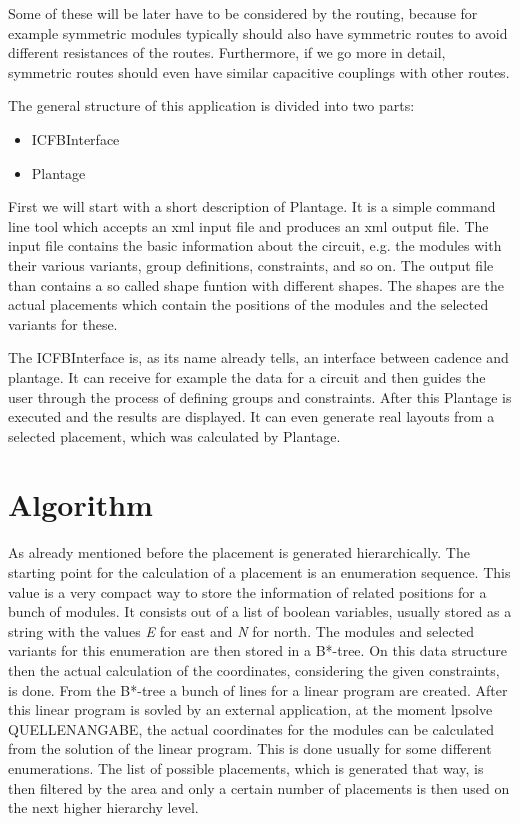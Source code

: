Some of these will be later have to be considered by the routing, because for example symmetric modules typically should also have symmetric routes to avoid different resistances of the routes. Furthermore, if we go more in detail, symmetric routes should even have similar capacitive couplings with other routes.

The general structure of this application is divided into two parts:
\begin{itemize}
\item ICFBInterface
\item Plantage
\end{itemize}

First we will start with a short description of Plantage. It is a simple command line tool which accepts an xml input file and produces an xml output file. The input file contains the basic information about the circuit, e.g. the modules with their various variants, group definitions, constraints, and so on. The output file than contains a so called shape funtion with different shapes. The shapes are the actual placements which contain the positions of the modules and the selected variants for these.

The ICFBInterface is, as its name already tells, an interface between cadence and plantage. It can receive for example the data for a circuit and then guides the user through the process of defining groups and constraints. After this Plantage is executed and the results are displayed. It can even generate real layouts from a selected placement, which was calculated by Plantage.

\section{Algorithm}
As already mentioned before the placement is generated hierarchically. The starting point for the calculation of a placement is an enumeration sequence. This value is a very compact way to store the information of related positions for a bunch of modules. It consists out of a list of boolean variables, usually stored as a string with the values \textit{E} for east and \textit{N} for north. The modules and selected variants for this enumeration are then stored in a B*-tree. On this data structure then the actual calculation of the coordinates, considering the given constraints, is done. From the B*-tree a bunch of lines for a linear program are created. After this linear program is sovled by an external application, at the moment lpsolve QUELLENANGABE, the actual coordinates for the modules can be calculated from the solution of the linear program. This is done usually for some different enumerations. The list of possible placements, which is generated that way, is then filtered by the area and only a certain number of placements is then used on the next higher hierarchy level.

